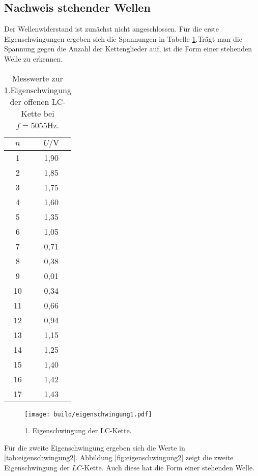 \subsection{Nachweis stehender Wellen}

Der Wellenwiderstand ist zunächst nicht angeschlossen. Für die erste Eigenschwingungen ergeben sich die Spannungen in Tabelle \ref{tab:eigenschwingung1}.Trägt man die Spannung gegen die Anzahl der Kettenglieder auf, ist die Form einer stehenden Welle zu erkennen.
\begin{table}
  \centering
  \caption{Messwerte zur 1.Eigenschwingung der offenen LC-Kette bei $f = 5055 \si{\Hz}$.}
  \label{tab:eigenschwingung1}
  \begin{tabular}{c c}
    \toprule
    $n$ & $U / \si{\volt}$ \\
\midrule
1 & 1,90 \\
2 & 1,85 \\
3 & 1,75 \\
4 & 1,60 \\
5 & 1,35 \\
6 & 1,05 \\
7 & 0,71 \\
8 & 0,38 \\
9 & 0,01 \\
10 & 0,34 \\
11 & 0,66 \\
12 & 0,94 \\
13 & 1,15 \\
14 & 1,25 \\
15 & 1,40 \\
16 & 1,42 \\
17 & 1,43 \\
\bottomrule
\end{tabular}
\end{table}

\begin{figure}
  \centering
  \texttt{[image: build/eigenschwingung1.pdf]}
\caption{1. Eigenschwingung der LC-Kette.}
  \label{fig:eigenschwingung1}
\end{figure}

Für die zweite Eigenschwingung ergeben sich die Werte in \ref{tab:eigenschwingung2}. Abbildung \ref{fig:eigenschwingung2} zeigt die zweite Eigenschwingung der $LC$-Kette. Auch diese hat die Form einer stehenden Welle.

